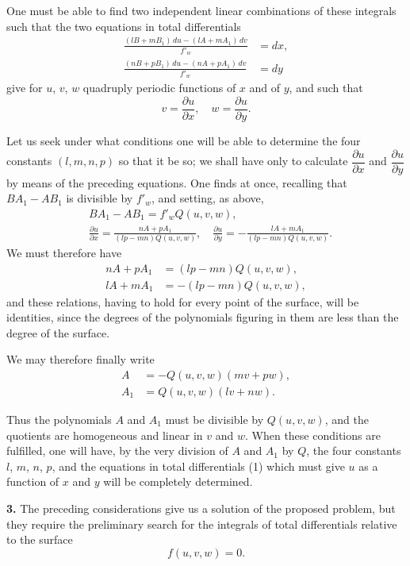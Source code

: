 \documentclass{article}
\begin{document}
One must be able to find two independent linear combinations of these integrals such that the two equations in total differentials
\[
\begin{aligned}
\frac{(lB + mB_{1})\,du - (lA + mA_{1})\,dv}{f'_{w}} &= dx, \\
\frac{(nB + pB_{1})\,du - (nA + pA_{1})\,dv}{f'_{w}} &= dy
\end{aligned}
\tag{1}
\]
give for $u$, $v$, $w$ quadruply periodic functions of $x$ and of $y$, and such that
\[
v = \frac{\partial u}{\partial x}, \quad w = \frac{\partial u}{\partial y}.
\]

Let us seek under what conditions one will be able to determine the four constants $(l, m, n, p)$ so that it be so; we shall have only to calculate $\dfrac{\partial u}{\partial x}$ and $\dfrac{\partial u}{\partial y}$ by means of the preceding equations. One finds at once, recalling that $BA_{1} - AB_{1}$ is divisible by $f'_{w}$, and setting, as above,
\[
\begin{aligned}
&BA_{1} - AB_{1} = f'_{w}Q(u, v, w), \\
&\frac{\partial u}{\partial x} = \frac{nA + pA_{1}}{(lp - mn)Q(u, v, w)}, \quad \frac{\partial u}{\partial y} = -\frac{lA + mA_{1}}{(lp - mn)Q(u, v, w)}.
\end{aligned}
\]
We must therefore have
\[
\begin{aligned}
nA + pA_{1} &= (lp - mn)Q(u, v, w), \\
lA + mA_{1} &= -(lp - mn)Q(u, v, w),
\end{aligned}
\]
and these relations, having to hold for every point of the surface, will be identities, since the degrees of the polynomials figuring in them are less than the degree of the surface.

We may therefore finally write
\[
\begin{aligned}
A &= -Q(u, v, w)(mv + pw), \\
A_{1} &= Q(u, v, w)(lv + nw).
\end{aligned}
\]

Thus the polynomials $A$ and $A_{1}$ must be divisible by $Q(u, v, w)$, and the quotients are homogeneous and linear in $v$ and $w$. When these conditions are fulfilled, one will have, by the very division of $A$ and $A_{1}$ by $Q$, the four constants $l$, $m$, $n$, $p$, and the equations in total differentials (1) which must give $u$ as a function of $x$ and $y$ will be completely determined.

\textbf{3.} The preceding considerations give us a solution of the proposed problem, but they require the preliminary search for the integrals of total differentials relative to the surface
\[
f(u, v, w) = 0. \tag{1}
\]
\end{document}
